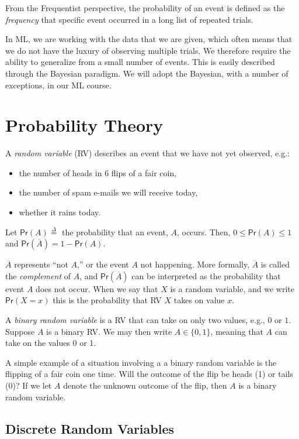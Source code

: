 \documentclass[twoside]{article}
\def\defn{\stackrel{\Delta}{=}} %
\def\Pr{\textsf{Pr}} %
\begin{document}
From the Frequentist perspective, the probability of an event is defined as the \emph{frequency} that specific event occurred in a long list of repeated trials.

In ML, we are working with the data that we are given, which often means that we do not have the luxury of observing multiple trials. We therefore require the ability to generalize from a small number of events. This is easily described through the Bayesian paradigm. We will adopt the Bayesian, with a number of exceptions, in our ML course.

\section{Probability Theory}
A \emph{random variable} (RV) describes an event that we have not yet observed, e.g.:
\begin{itemize}
  \item the number of heads in 6 flips of a fair coin,
  \item the number of spam e-mails we will receive today,
  \item whether it rains today.
\end{itemize} 


Let $\Pr(A) \defn$ the probability that an event, $A$, occurs. Then, $0 \leq \Pr(A) \leq 1$ and $\Pr(\overline{A}) = 1 - \Pr(A)$.

$\overline{A}$ represents ``not $A$,'' or the event $A$ not happening. More formally, $\overline{A}$ is called the \emph{complement} of $A$, and $\Pr(\overline{A})$ can be interpreted as the probability that event $A$ does not occur. When we say that $X$ is a random variable, and we write $\Pr(X=x)$ this is the probability that RV $X$ takes on value $x$.

A \emph{binary random variable} is a RV that can take on only two values, e.g., $0$ or $1$. Suppose $A$ is a binary RV. We may then write $A \in \lbrace 0, 1 \rbrace$, meaning that $A$ can take on the values 0 or 1. 

A simple example of a situation involving a a binary random variable is the flipping of a fair coin one time. Will the outcome of the flip be heads (1) or tails (0)? If we let $A$ denote the unknown outcome of the flip, then $A$ is a binary random variable. 

\subsection*{Discrete Random Variables} 
\end{document}
